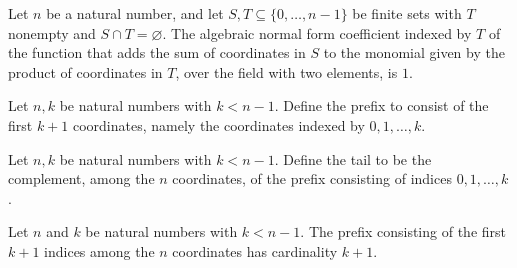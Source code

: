 \begin{theorem}
\label{FABL.anfCoeff_coordinateSum_add_anfMonomial_of_disjoint}
\leanok
{}
Let $n$ be a natural number, and let $S,T\subseteq\{0,\ldots,n-1\}$ be finite sets with
$T$ nonempty and $S\cap T=\varnothing$. The algebraic normal form coefficient indexed by
$T$ of the function that adds the sum of coordinates in $S$ to the monomial given by the
product of coordinates in $T$, over the field with two elements, is $1$.
\end{theorem}

\begin{definition}
\label{FABL.resilientSharpnessPrefix}
\leanok
Let $n,k$ be natural numbers with $k<n-1$. Define the prefix to consist of the first
$k+1$ coordinates, namely the coordinates indexed by $0,1,\ldots,k$.
\end{definition}

\begin{definition}
\label{FABL.resilientSharpnessTail}
\leanok
{}
Let $n,k$ be natural numbers with $k<n-1$. Define the tail to be the complement, among
the $n$ coordinates, of the prefix consisting of indices $0,1,\ldots,k$.
\end{definition}

\begin{theorem}
\label{FABL.card_resilientSharpnessPrefix}
\leanok
{}
Let $n$ and $k$ be natural numbers with $k<n-1$. The prefix consisting of the first
$k+1$ indices among the $n$ coordinates has cardinality $k+1$.
\end{theorem}

